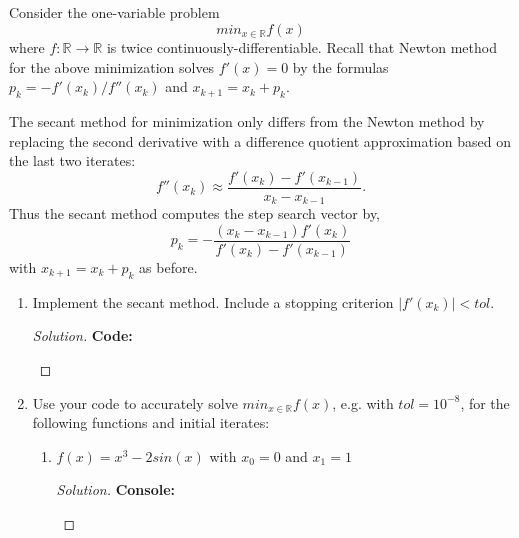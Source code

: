\documentclass[12pt]{article}
\makeatletter
\theoremstyle{homework}
\newenvironment{exercise}[1]
{\def\@currentlabel{#1}\exercisecore}
{\endexercisecore}
\newcommand{\Reals}{\ensuremath{\mathbb R}}
\let\RR\Reals
\makeatother
\begin{document}
\begin{exercise}{P17} Consider the one-variable problem
  \begin{equation*}
    min_{x \in \RR}f(x)
  \end{equation*}
  where $f: \RR \to \RR$ is twice continuously-differentiable. Recall that Newton method for the above minimization solves $f'(x) = 0$
  by the formulas $p_k =-f'(x_k)/f''(x_k)$ and $x_{k+1} = x_k + p_k$. 
  
  The secant method for minimization only differs from the Newton method by replacing the second derivative with a difference quotient approximation based on 
  the last two iterates:
  \begin{equation*}
    f''(x_k) \approx \frac{f'(x_k) - f'(x_{k - 1})}{x_k - x_{k - 1}}.
  \end{equation*}
  Thus the secant method computes the step search vector by, 
  \begin{equation*}
    p_k = -\frac{(x_k - x_{k - 1}) f'(x_k)}{f'(x_k) - f'(x_{k - 1})}
  \end{equation*}
  with $x_{k + 1}= x_k + p_k$ as before. 
  \begin{enumerate}
    \item[(a)] Implement the secant method. Include a stopping criterion $|f'(x_k)|< tol$.
    \begin{proof}[Solution]
      \textbf{Code:}
      \begin{center}
        
      \end{center}
    \end{proof}
\vspace{.5in}


    \item[(b)] Use your code to accurately solve $min_{x \in \RR}f(x)$, e.g. with $tol = 10^{-8}$, 
    for the following functions and initial iterates:
    \begin{enumerate}
      \item[(i)] $f(x) = x^3 - 2sin(x)$ with $x_0 = 0$ and $x_1 = 1$
      \begin{proof}[Solution]

        \textbf{Console:}
        \begin{center}
          
        \end{center}
      \end{proof}
      \vspace{.15in}


\end{enumerate}
\end{enumerate}
\end{exercise}
\end{document}
